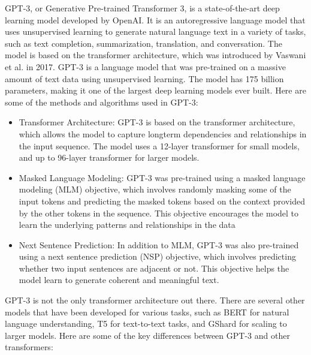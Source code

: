 \documentclass[letterpaper, 10 pt, conference]{ieeeconf}  %
\begin{document}
GPT-3, or Generative Pre-trained Transformer 3, is a state-of-the-art deep learning model developed by OpenAI. It is an
autoregressive language model that uses unsupervised learning to generate natural language text in a variety of tasks, such as text
completion, summarization, translation, and conversation. The model is based on the transformer architecture, which was
introduced by Vaswani et al. in 2017.
GPT-3 is a language model that was pre-trained on a massive amount of text data using unsupervised learning. The model has
175 billion parameters, making it one of the largest deep learning models ever built. Here are some of the methods and algorithms
used in GPT-3:
 \begin{itemize}
     \item Transformer Architecture: GPT-3 is based on the transformer architecture, which allows the model to capture longterm dependencies and relationships in the input sequence. The model uses a 12-layer transformer for small models, and
up to 96-layer transformer for larger models. 
     \item Masked Language Modeling: GPT-3 was pre-trained using a masked language modeling (MLM) objective, which
involves randomly masking some of the input tokens and predicting the masked tokens based on the context provided by
the other tokens in the sequence. This objective encourages the model to learn the underlying patterns and relationships
in the data
     \item  Next Sentence Prediction: In addition to MLM, GPT-3 was also pre-trained using a next sentence prediction (NSP)
objective, which involves predicting whether two input sentences are adjacent or not. This objective helps the model
learn to generate coherent and meaningful text.

 \end{itemize}

GPT-3 is not the only transformer architecture out there. There are several other models that have been developed for various
tasks, such as BERT for natural language understanding, T5 for text-to-text tasks, and GShard for scaling to larger models. Here
are some of the key differences between GPT-3 and other transformers:
\end{document}
